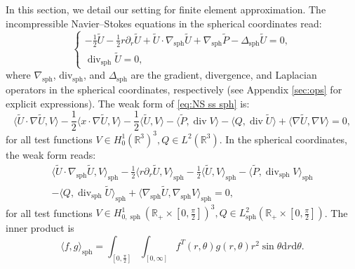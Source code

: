 \documentclass[11pt,a4paper]{article}
\numberwithin{equation}{section}
\newcommand{\cdummy}{\cdot}
\newcommand{\mathd}{\mathrm{d}}
\newcommand{\nosymbol}{}
\newcommand{\tmop}[1]{\ensuremath{\operatorname{#1}}}
\begin{document}
In this section, we detail our setting for finite element approximation. The
incompressible Navier--Stokes equations in the spherical coordinates read:
\begin{equation}
  \left\{\begin{array}{l}
    - \frac{1}{2}  \widetilde{U} - \frac{1}{2} r \partial_r  \widetilde{U} + \widetilde{U}
    \cdot \nabla_{\tmop{sph}}  \widetilde{U} + \nabla_{\tmop{sph}} \widetilde{P} -
    \Delta_{\tmop{sph}}  \widetilde{U} = 0,\\
    \tmop{div}_{\tmop{sph}}  \widetilde{U} = 0,
  \end{array}\right. \label{eq:NS ss sph}
\end{equation}
where $\nabla_{\text{sph}}$, $\text{div}_{\text{sph}}$, and
$\Delta_{\text{sph}}$ are the gradient, divergence, and Laplacian operators in
the spherical coordinates, respectively (see Appendix \ref{sec:ops} for explicit
expressions). The weak form of \eqref{eq:NS ss sph} is:
\begin{equation*}
  \langle \widetilde{U} \cdummy \nabla \widetilde{U}, V \rangle - \frac{1}{2} \langle
  x \cdummy \nabla \widetilde{U}, V \rangle - \frac{1}{2} \langle \widetilde{U}, V
  \rangle - \langle \widetilde{P}, \tmop{div} V \rangle - \langle Q, \tmop{div}
  \widetilde{U} \rangle + \langle \nabla \widetilde{U}, \nabla V \rangle = 0,
  \label{eq:weak NS}
\end{equation*}
for all test functions $V \in H_0^1 (\mathbb{R}^3)^3, Q \in L^2
(\mathbb{R}^3)$. In the spherical coordinates, the weak form
reads:
\begin{equation*}
  \begin{array}{l}
    \langle \widetilde{U} \cdummy \nabla_{\tmop{sph}} \widetilde{U}, V
    \rangle_{\tmop{sph}} - \frac{1}{2} \langle r \partial_r \widetilde{U}, V
    \rangle_{\tmop{sph}} - \frac{1}{2} \langle \widetilde{U}, V
    \rangle_{\tmop{sph}} - \langle \widetilde{P}, \tmop{div}_{\tmop{sph}} V
    \rangle_{\tmop{sph}}\\
    - \langle Q, \tmop{div}_{\tmop{sph}}  \widetilde{U} \rangle_{\tmop{sph}} +
    \langle \nabla_{\tmop{sph}} \widetilde{U}, \nabla_{\tmop{sph}} V
    \rangle_{\tmop{sph}} = 0,
  \end{array}
\end{equation*}
for all test functions $V \in H^1_{0,\tmop{sph}} ( \mathbb{R}_+ \times
[ 0, \frac{\pi}{2} ] )^3, Q \in L^2_{\tmop{sph}} (
\mathbb{R}_+ \times[ 0, \frac{\pi}{2} ] )$.
 The inner product is
\[ \langle f, g \rangle_{\tmop{sph}} = \int_{\left[ 0, \frac{\pi}{2}
   \right]}\int_{\left[ 0, \infty\right]} f^T (r, \theta) \nosymbol g (r, \theta) r^2 \sin \theta \mathd r \mathd \theta . \]
\end{document}

